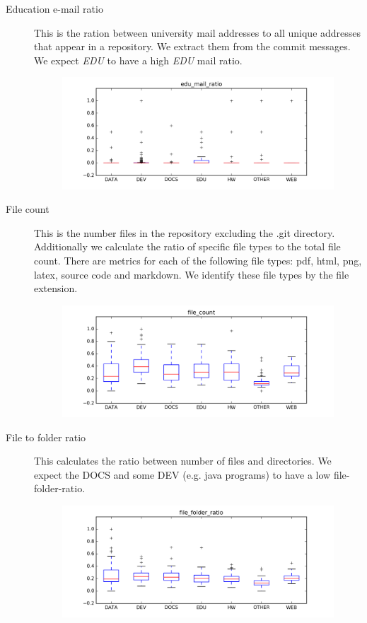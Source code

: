 \documentclass[a4paper]{scrartcl}
\begin{document}
\begin{description}
\begin{figure}[h!]
				\end{figure}
			\item[Education e-mail ratio]
				This is the ration between university mail addresses to all unique addresses that appear in a repository. We extract them from the commit messages. We expect \emph{EDU} to have a high \emph{EDU} mail ratio.
				\begin{figure}[h!]
					\centering
					\includegraphics[width=0.75\linewidth]{figures/edu_mail_ratio.png}
				\end{figure}
			\item[File count]
				This is the number files in the repository excluding the .git directory. Additionally we calculate the ratio of specific file types to the total file count. There are metrics for each of the following file types: pdf, html, png, latex, source code and markdown. We identify these file types by the file extension.
				\begin{figure}[h!]
					\centering
					\includegraphics[width=0.75\linewidth]{figures/file_count.png}
				\end{figure}
			\item[File to folder ratio]
				This calculates the ratio between number of files and directories. We expect the DOCS and some DEV (e.g. java programs) to have a low file-folder-ratio.
				\begin{figure}[h!]
					\centering
					\includegraphics[width=0.75\linewidth]{figures/file_folder_ratio.png}

\end{figure}
\end{description}
\end{document}
